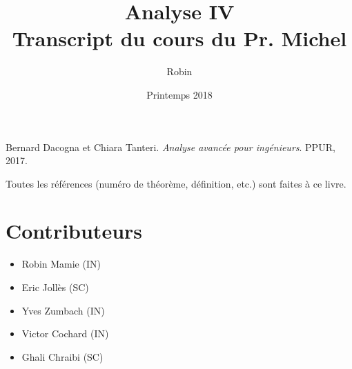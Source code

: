 \documentclass[a4paper, 11pt]{report}
\title{\textbf{Analyse IV} \\
Transcript du cours du Pr. Michel \bsc{Cibils}}
\author{Robin \bsc{Mamié}}
\date{Printemps 2018}
\theoremstyle{definition}
\theoremstyle{remark}
\begin{document}
\maketitle

\tableofcontents







\begin{thebibliography}{9}
    Bernard Dacogna et Chiara Tanteri. 
    \textit{Analyse avancée pour ingénieurs}. 
    PPUR, 2017.
\end{thebibliography}

Toutes les références (numéro de théorème, définition, etc.) sont faites à ce livre.


\section*{Contributeurs}

\begin{itemize}
    \item Robin Mamie (IN)
    \item Eric Jollès (SC)
    \item Yves Zumbach (IN)
    \item Victor Cochard (IN)
    \item Ghali Chraibi (SC)
\end{itemize}
\end{document}
